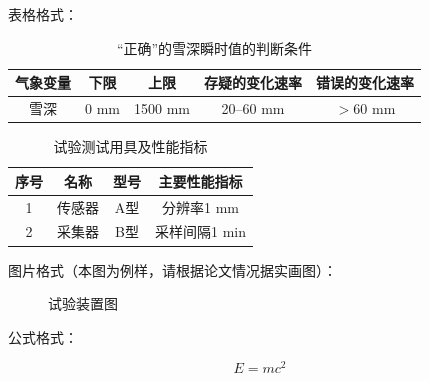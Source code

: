 表格格式：

\begin{table}[htbp]
  \centering
  \caption{“正确”的雪深瞬时值的判断条件\cite{ref-standard,ref-lantian}}
  \begin{tabular}{ccccc}
    \toprule
    气象变量 & 下限 & 上限 & 存疑的变化速率 & 错误的变化速率 \\
    \midrule
    雪深 & 0 mm & 1500 mm & 20--60 mm & $>60$ mm \\
    \bottomrule
  \end{tabular}
\end{table}

\begin{table}[htbp]
  \centering
  \caption{试验测试用具及性能指标}
  \begin{tabular}{cccc}
    \toprule
    序号 & 名称 & 型号 & 主要性能指标 \\
    \midrule
    1 & 传感器 & A型 & 分辨率1 mm \\
    2 & 采集器 & B型 & 采样间隔1 min \\
    \bottomrule
  \end{tabular}
\end{table}

图片格式（本图为例样，请根据论文情况据实画图）：

\begin{figure}[htbp]
  \centering
  \fbox{\rule{0pt}{6cm}\rule{8cm}{0pt}}
  \caption{试验装置图}
\end{figure}

公式格式：

\begin{equation}
  E = mc^2
\end{equation}
